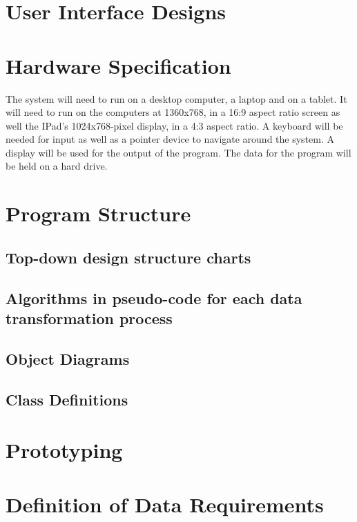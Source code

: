 \section{User Interface Designs}

\section{Hardware Specification}
The system will need to run on a desktop computer, a laptop and on a tablet. It will need to run on the computers at 1360x768, in a 16:9 aspect ratio screen as well the IPad's 1024x768-pixel display, in a 4:3 aspect ratio. A keyboard will be needed for input as well as a pointer device to navigate around the system. A display will be used for the output of the program. The data for the program will be held on a hard drive.
\section{Program Structure}

\subsection{Top-down design structure charts}

\subsection{Algorithms in pseudo-code for each data transformation process}

\subsection{Object Diagrams}

\subsection{Class Definitions}

\section{Prototyping}

\section{Definition of Data Requirements}

